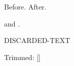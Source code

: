 \documentclass{article}
\begin{document}
Before.  After.

 and .

\begin{discardcontent}
DISCARDED-TEXT
\end{discardcontent}

Trimmed: []
\end{document}
